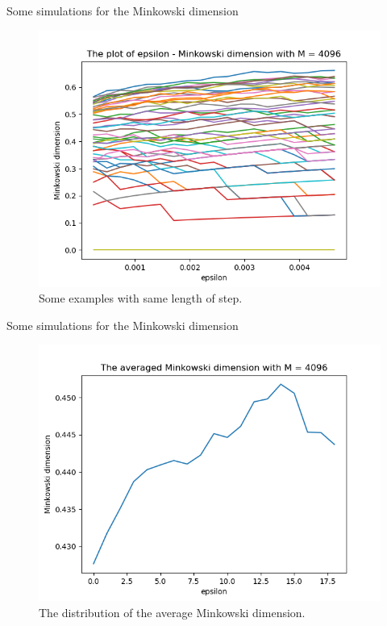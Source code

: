 \documentclass[t]{beamer}
\begin{document}
\begin{frame}{Some simulations for the Minkowski dimension}
    \begin{figure}
        \centering
        \includegraphics[scale=0.50]{sameM.png}
        \caption{Some examples with same length of step.}
        \label{fig:same_step}
    \end{figure}
\end{frame}

\begin{frame}{Some simulations for the Minkowski dimension}
    \begin{figure}
        \centering
        \includegraphics[scale=0.50]{mean.png}
        \caption{The distribution of the average Minkowski dimension.}
        \label{fig:average}
    \end{figure}
\end{frame}
\end{document}
